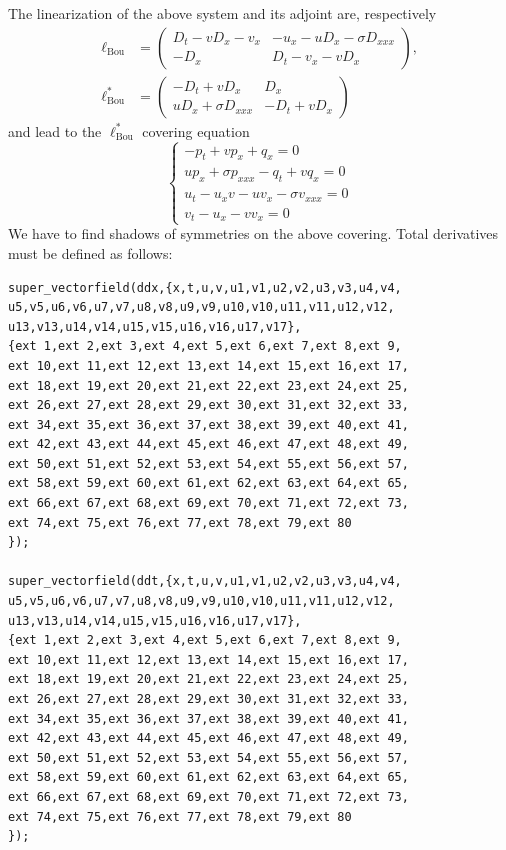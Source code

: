 The linearization of the above system and its adjoint are, respectively
\begin{align*}
  \ell_{\text{Bou}} &=
  \begin{pmatrix}
    D_t-vD_x-v_x & -u_x-uD_x-\sigma D_{xxx}\\
    -D_x & D_t-v_x-vD_x
  \end{pmatrix},\\
  \ell^*_{\text{Bou}} & =
  \begin{pmatrix}
    -D_t+vD_x & D_x\\
    uD_x+\sigma D_{xxx} & -D_t+vD_x
  \end{pmatrix}
\end{align*}
and lead to the $\ell^*_{\text{Bou}}$ covering equation
\[
  \label{cdiffeq:2}
  \left\{
  \begin{array}{l}
    -p_t+vp_x+q_x=0\\
    up_x+\sigma p_{xxx}-q_t+vq_x=0\\
  u_t-u_xv-uv_x-\sigma v_{xxx}=0\\
  v_t-u_x-vv_x=0
\end{array}
\right.
\]
We have to find shadows of symmetries on the above covering.
Total derivatives must be defined as follows:
\begin{verbatim}
super_vectorfield(ddx,{x,t,u,v,u1,v1,u2,v2,u3,v3,u4,v4,
u5,v5,u6,v6,u7,v7,u8,v8,u9,v9,u10,v10,u11,v11,u12,v12,
u13,v13,u14,v14,u15,v15,u16,v16,u17,v17},
{ext 1,ext 2,ext 3,ext 4,ext 5,ext 6,ext 7,ext 8,ext 9,
ext 10,ext 11,ext 12,ext 13,ext 14,ext 15,ext 16,ext 17,
ext 18,ext 19,ext 20,ext 21,ext 22,ext 23,ext 24,ext 25,
ext 26,ext 27,ext 28,ext 29,ext 30,ext 31,ext 32,ext 33,
ext 34,ext 35,ext 36,ext 37,ext 38,ext 39,ext 40,ext 41,
ext 42,ext 43,ext 44,ext 45,ext 46,ext 47,ext 48,ext 49,
ext 50,ext 51,ext 52,ext 53,ext 54,ext 55,ext 56,ext 57,
ext 58,ext 59,ext 60,ext 61,ext 62,ext 63,ext 64,ext 65,
ext 66,ext 67,ext 68,ext 69,ext 70,ext 71,ext 72,ext 73,
ext 74,ext 75,ext 76,ext 77,ext 78,ext 79,ext 80
});

super_vectorfield(ddt,{x,t,u,v,u1,v1,u2,v2,u3,v3,u4,v4,
u5,v5,u6,v6,u7,v7,u8,v8,u9,v9,u10,v10,u11,v11,u12,v12,
u13,v13,u14,v14,u15,v15,u16,v16,u17,v17},
{ext 1,ext 2,ext 3,ext 4,ext 5,ext 6,ext 7,ext 8,ext 9,
ext 10,ext 11,ext 12,ext 13,ext 14,ext 15,ext 16,ext 17,
ext 18,ext 19,ext 20,ext 21,ext 22,ext 23,ext 24,ext 25,
ext 26,ext 27,ext 28,ext 29,ext 30,ext 31,ext 32,ext 33,
ext 34,ext 35,ext 36,ext 37,ext 38,ext 39,ext 40,ext 41,
ext 42,ext 43,ext 44,ext 45,ext 46,ext 47,ext 48,ext 49,
ext 50,ext 51,ext 52,ext 53,ext 54,ext 55,ext 56,ext 57,
ext 58,ext 59,ext 60,ext 61,ext 62,ext 63,ext 64,ext 65,
ext 66,ext 67,ext 68,ext 69,ext 70,ext 71,ext 72,ext 73,
ext 74,ext 75,ext 76,ext 77,ext 78,ext 79,ext 80
});
\end{verbatim}
